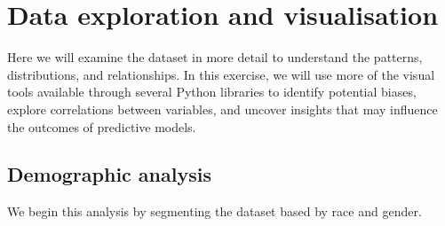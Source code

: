 \section{Data exploration and visualisation}
\label{secn:data-exploration}

Here we will examine the dataset in more detail to understand the patterns, distributions, and relationships. In this exercise, we will use more of the visual tools available through several Python libraries to identify potential biases, explore correlations between variables, and uncover insights that may influence the outcomes of predictive models. 

\subsection {Demographic analysis}

We begin this analysis by segmenting the dataset based by race and gender.





